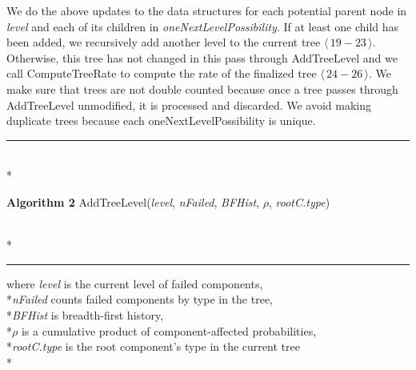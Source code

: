 \documentclass[12pt]{article}
\newcommand{\changed}[1]{#1}
\newcommand{\changed}[1]{\textcolor{red}{#1}}
\newcommand{\captionAmerica}[2]{\noindent\hrLine\vspace{-0.25em}\\*{\raggedright\textbf{Algorithm #1} #2}\vspace{-0.8em}\\*\hrLine}
\newcommand{\hrLine}{\hspace{\fill}\rule{1.0\linewidth}{0.7pt}\hspace{\fill}}
\newcommand{\varName}[1]{\textrm{\it#1}}
\newcommand{\citeBlock}[2]{$\langle \, #1 - #2 \, \rangle$}
\begin{document}
We do the above updates to
\changed{the}
data structures for each potential parent node in \varName{level} and each of its children in \varName{oneNextLevelPossibility}. If at least one child has been added, we recursively add another level to the current tree \citeBlock{19}{23}. Otherwise, this tree has not changed in this pass through AddTreeLevel and we call ComputeTreeRate to compute the rate of the finalized tree \citeBlock{24}{26}. We make sure that trees are not double counted because once a tree passes through AddTreeLevel unmodified, it is processed and discarded. We avoid making duplicate trees because each oneNextLevelPossibility is unique.

\captionAmerica{2}{AddTreeLevel(\varName{level}, \varName{nFailed}, \varName{BFHist}, $\rho$, \varName{rootC.type})}
where \varName{level} is the current level of failed components, \\*\varName{nFailed} counts failed components by type in the tree, \\*\varName{BFHist} is breadth-first history, \\*$\rho$ is a cumulative product of component-affected probabilities, \\*\varName{rootC.type} is the root component's type in the current tree
\\*\vspace{0.8em}
\end{document}
